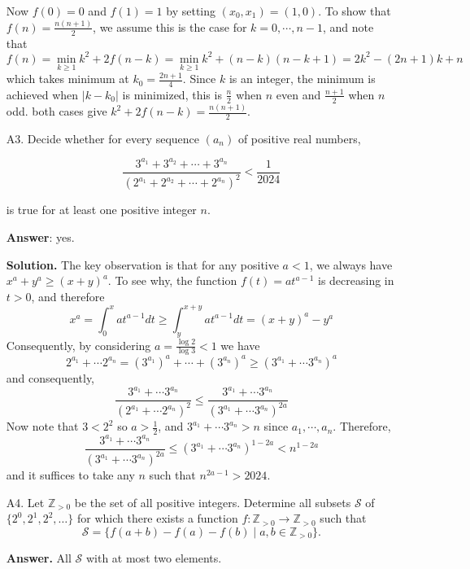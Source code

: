 \documentclass[11pt,a4paper]{article}
\begin{document}
\begin{enumerate}
		Now $f(0) = 0$ and $f(1)=1$ by setting $(x_0, x_1)=(1, 0)$. 
		To show that $f(n) = \frac{n(n+1)}{2}$, we assume this is the case for $k=0, \cdots, n - 1$, 
		and note that 
		\[
		f(n) = \min_{k\ge 1} k^2 + 2f(n - k) 
		= \min_{k\ge 1} k^2 + (n - k)(n - k + 1) = 2k^2 -(2n + 1)k + n
		\]
		which takes minimum at $k_0 = \frac{2n + 1}{4}$. 
		Since $k$ is an integer, the minimum is achieved when $|k - k_0|$ is minimized, 
		this is $\frac{n}{2}$ when $n$ even and $\frac{n + 1}{2}$ when $n$ odd. 
		both cases give $k^2 + 2f(n - k) = \frac{n(n+1)}{2}$. 
		
		\item [A3.]
		Decide whether for every sequence $(a_n)$ of positive real numbers,
		
		\[\frac{3^{a_1}+3^{a_2}+\cdots+3^{a_n}}{(2^{a_1}+2^{a_2}+\cdots+2^{a_n})^2} < \frac{1}{2024}\]
		
		is true for at least one positive integer $n$.
		
		
		\textbf{Answer}: yes. 
		
		\textbf{Solution.} The key observation is that for any positive $a < 1$, 
		we always have $x^a + y^a\ge (x + y)^a$. 
		To see why, the function $f(t) = at^{a - 1}$ is decreasing in $t > 0$, and therefore 
		\[
		x^a = \int_0^x at^{a - 1}dt \ge \int_y^{x + y} at^{a - 1}dt
		=(x+y)^a - y^a
		\]
		Consequently, by considering $a = \frac{\log 2}{\log 3} < 1$ we have 
		\[
		2^{a_1}+\cdots 2^{a_n}
		=(3^{a_1})^a + \cdots + (3^{a_n})^a
		\ge (3^{a_1} + \cdots 3^{a_n})^a
		\]
		and consequently, 
		\[
		\frac{3^{a_1} + \cdots 3^{a_n}}{(2^{a_1} + \cdots 2^{a_n})^2}
		\le \frac{3^{a_1} + \cdots 3^{a_n}}{(3^{a_1} + \cdots 3^{a_n})^{2a}}
		\]
		Now note that $3 < 2^2$ so $a > \frac 12$, and 
		$3^{a_1} + \cdots 3^{a_n} > n$ since $a_1, \cdots, a_n$. 
		Therefore, 
		\[
		\frac{3^{a_1} + \cdots 3^{a_n}}{(3^{a_1} + \cdots 3^{a_n})^{2a}}
		\le (3^{a_1} + \cdots 3^{a_n})^{1-2a}
		< n^{1-2a}
		\]
		and it suffices to take any $n$ such that $n^{2a - 1} > 2024$. 
		
		\item [A4.]
		Let \(\mathbb{Z}_{>0}\) be the set of all positive integers. Determine all subsets \(\mathcal{S}\) of \(\{2^{0},2^{1},2^{2},\ldots\}\) for which there exists a function \(f\colon\mathbb{Z}_{>0}\to\mathbb{Z}_{>0}\) such that
		\[\mathcal{S}=\{f(a+b)-f(a)-f(b)\mid a,b\in\mathbb{Z}_{>0}\}.\]
		
		\textbf{Answer.} 
		All $\mathcal{S}$ with at most two elements. 
		

\end{enumerate}
\end{document}
